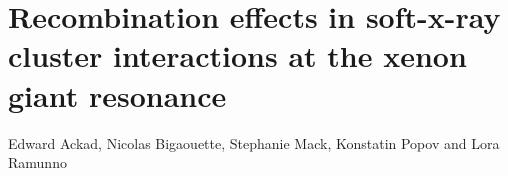 

\newcommand{\PaperTitleRecomb}{Recombination effects in soft-x-ray cluster interactions at the xenon giant resonance}

\section{\PaperTitleRecomb}
\label{section:papers:recomb}

\begin{flushright}
Edward Ackad, Nicolas Bigaouette, Stephanie Mack, Konstatin Popov and Lora Ramunno
\end{flushright}

\HidePDFAbstractNumber


